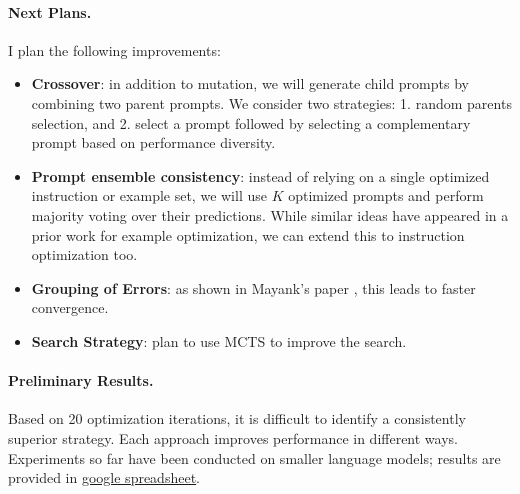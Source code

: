 \documentclass[12pt]{article}
\begin{document}
\paragraph{Next Plans.}
I plan the following improvements:
\begin{itemize}
    \item \textbf{Crossover}: in addition to mutation, we will generate child prompts by combining two parent prompts. We consider two strategies: 1. random parents selection, and  2. select a prompt followed by selecting a complementary prompt based on performance diversity.
    \item \textbf{Prompt ensemble consistency}: instead of relying on a single optimized instruction or example set, we will use $K$ optimized prompts and perform majority voting over their predictions. While similar ideas have appeared in a prior work for example optimization, we can extend this to instruction optimization too.
    \item \textbf{Grouping of Errors}: as shown in Mayank's paper \cite{errortaxonomyguidedpromptoptimization}, this leads to faster convergence.
    \item \textbf{Search Strategy}: plan to use MCTS to improve the search.
\end{itemize}

\paragraph{Preliminary Results.}
Based on 20 optimization iterations, it is difficult to identify a consistently superior strategy. Each approach improves performance in different ways. Experiments so far have been conducted on smaller language models; results are provided in \href{https://docs.google.com/spreadsheets/d/1TqksrWuOMQou9d6Gw3v76Cl5vYUVknkd3l3zEFPUwdI/edit?gid=256007829#gid=256007829}{google spreadsheet}.

  
    
\end{document}
